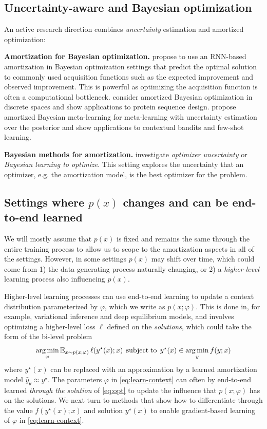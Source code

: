 \documentclass[twoside,11pt]{article}
\newcommand{\eg}{e.g.\xspace}
\begin{document}
\subsection{Uncertainty-aware and Bayesian optimization}
An active research direction combines \emph{uncertainty} estimation
and amortized optimization:

\textbf{Amortization for Bayesian optimization.}
\citet{chen2017learning} propose to use an RNN-based
  amortization in Bayesian optimization settings that
  predict the optimal solution to commonly used
  acquisition functions such as the expected improvement
  and observed improvement.
  This is powerful as optimizing the acquisition function
  is often a computational bottleneck.
\citet{swersky2020amortized} consider amortized
  Bayesian optimization in discrete spaces and show
  applications to protein sequence design.
\citet{ravi2018amortized} propose amortized
  Bayesian meta-learning for meta-learning with uncertainty
  estimation over the posterior and show applications to
  contextual bandits and few-shot learning.

\textbf{Bayesian methods for amortization.}
\citet{you2022bayesian} investigate \emph{optimizer uncertainty}
or \emph{Bayesian learning to optimize}.
This setting explores the uncertainty that an optimizer,
\eg the amortization model, is the best optimizer for
the problem.


\subsection{Settings where $p(x)$ changes and can be end-to-end learned}
We will mostly assume that $p(x)$ is fixed and remains
the same through the entire training process to allow us
to scope to the amortization aspects in all of the settings.
However, in some settings $p(x)$ may shift over time, which
could come from 1) the data generating process naturally
changing, or 2) a \emph{higher-level} learning process
also influencing $p(x)$.

Higher-level learning processes can use end-to-end learning
to update a context distribution parameterized by
$\varphi$, which we write as $p(x; \varphi)$.
This is done in, for example, variational inference
and deep equilibrium models, and involves optimizing
a higher-level loss $\ell$ defined on the \emph{solutions},
which could take the form of the bi-level problem
\begin{equation}
  \operatorname*{arg\,min}_{\varphi} \operatorname{\mathbb{E}}_{x\sim p(x; \varphi)} \ell(y^\star(x); x)\;
  \operatorname*{subject\;to}\; y^\star(x)\in\operatorname*{arg\,min}_y f(y; x)
\label{eq:learn-context}
\end{equation}
where $y^\star(x)$ can be replaced with an approximation
by a learned amortization model $\hat y_\theta \approx y^\star$.
The parameters $\varphi$ in \cref{eq:learn-context} can
often by end-to-end learned \emph{through the solution} of
\cref{eq:opt} to update the influence that $p(x; \varphi)$
has on the solutions.
We next turn to methods that show how to differentiate
through the value $f(y^\star(x); x)$ and solution
$y^\star(x)$ to enable gradient-based learning of
$\varphi$ in \cref{eq:learn-context}.
\end{document}
